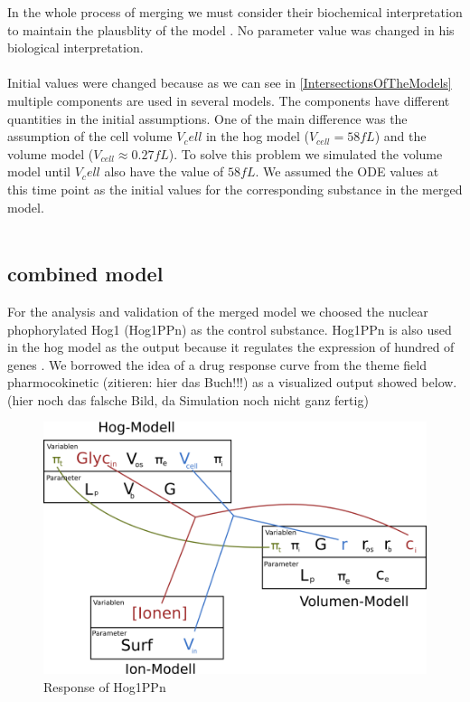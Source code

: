In the whole process of merging we must consider their biochemical interpretation to maintain the plausblity of the model \cite{Liebermeister2008ValidityAC}. No parameter value was changed in his biological interpretation.\\\\

Initial values were changed because as we can see in \ref{IntersectionsOfTheModels} multiple components are used in several models. The components have different quantities in the initial assumptions. One of the main difference was the assumption of the cell volume $V_cell$ in the hog model ($V_{cell}=58fL $) and the volume model ($V_{cell} \approx 0.27fL$). To solve this problem we simulated the volume model until $V_cell$ also have the value of $58fL$. We assumed the ODE values at this time point as the initial values for the corresponding substance in the merged model. \\\\

\subsection{combined model}
For the analysis and validation of the merged model we choosed the nuclear phophorylated Hog1 (Hog1PPn) as the control substance. Hog1PPn is also used in the hog model as the output because it regulates the expression of hundred of genes \cite{Zi_2010}. We borrowed the idea of a drug response curve from the theme field pharmocokinetic (zitieren: hier das Buch!!!) as a visualized output showed below.  \\
(hier noch das falsche Bild, da Simulation noch nicht ganz fertig)
\begin{figure}[h!]
	\begin{center}
		\begin{minipage}{0,8\textwidth}
			
			\includegraphics[width=\textwidth]{picture/model_intersections.png}
			\caption{Response of Hog1PPn} 
			\label{DrugResponseCurve} 
		\end{minipage}
	\end{center}
\end{figure}

